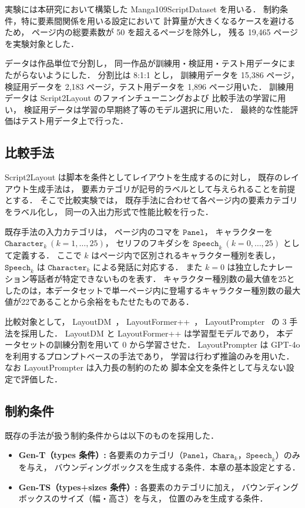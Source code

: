 \documentclass[a4j,12pt,dvipdfmx]{jsreport}
\begin{document}
実験には本研究において構築した Manga109ScriptDataset を用いる．
制約条件，特に要素間関係を用いる設定において
計算量が大きくなるケースを避けるため，
ページ内の総要素数が 50 を超えるページを除外し，
残る 19,465 ページを実験対象とした．

データは作品単位で分割し，
同一作品が訓練用・検証用・テスト用データにまたがらないようにした．
分割比は 8:1:1 とし，
訓練用データを 15,386 ページ，検証用データを 2,183 ページ，テスト用データを 1,896 ページ用いた．
訓練用データは Script2Layout のファインチューニングおよび
比較手法の学習に用い，
検証用データは学習の早期終了等のモデル選択に用いた．
最終的な性能評価はテスト用データ上で行った．
\subsection{比較手法}

Script2Layout は脚本を条件としてレイアウトを生成するのに対し，
既存のレイアウト生成手法は，
要素カテゴリが記号的ラベルとして与えられることを前提とする．
そこで比較実験では，
既存手法に合わせて各ページ内の要素カテゴリをラベル化し，
同一の入出力形式で性能比較を行った．

既存手法の入力カテゴリは，
ページ内のコマを $\texttt{Panel}$，
キャラクターを $\texttt{Character}_k\ (k=1,\dots,25)$，
セリフのフキダシを $\texttt{Speech}_k\ (k=0,\dots,25)$
として定義する．
ここで $k$ はページ内で区別されるキャラクター種別を表し，
$\texttt{Speech}_k$ は $\texttt{Character}_k$ による発話に対応する．
また $k=0$ は独立したナレーション等話者が特定できないものを表す．
キャラクター種別数の最大値を25としたのは，本データセットで単一ページ内に登場するキャラクター種別数の最大値が22であることから余裕をもたせたものである．

比較対象として，
LayoutDM~\cite{inoue_layoutdm_2023}，
LayoutFormer++~\cite{jiang_layoutformer_2023}，
LayoutPrompter~\cite{lin_layoutprompter_2023}
の 3 手法を採用した．
LayoutDM と LayoutFormer++ は学習型モデルであり，
本データセットの訓練分割を用いて 0 から学習させた．
LayoutPrompter は GPT-4o を利用するプロンプトベースの手法であり，
学習は行わず推論のみを用いた．
なお LayoutPrompter は入力長の制約のため
脚本全文を条件として与えない設定で評価した．

\subsection{制約条件}
既存の手法が扱う制約条件からは以下のものを採用した．

\begin{itemize}
  \item \textbf{Gen-T（types 条件）:}
        各要素のカテゴリ（$\texttt{Panel}$，$\texttt{Chara}_k$，$\texttt{Speech}_k$）のみを与え，
        バウンディングボックスを生成する条件．本章の基本設定とする．
  \item \textbf{Gen-TS（types+sizes 条件）:}
        各要素のカテゴリに加え，
        バウンディングボックスのサイズ（幅・高さ）を与え，
        位置のみを生成する条件．
\end{itemize}
\end{document}
